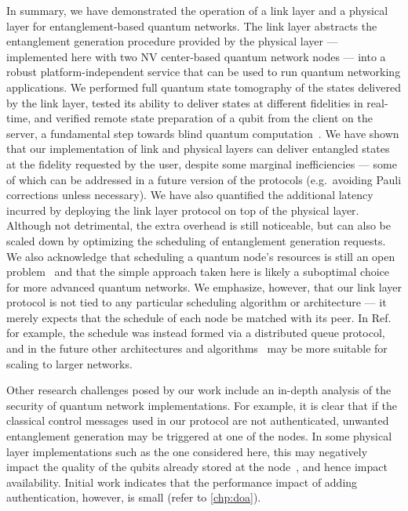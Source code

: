 In summary, we have demonstrated the operation of a link layer and a physical layer for
entanglement-based quantum networks. The link layer abstracts the entanglement generation procedure
provided by the physical layer --- implemented here with two NV center-based quantum network nodes
--- into a robust platform-independent service that can be used to run quantum networking
applications. We performed full quantum state tomography of the states delivered by the link layer,
tested its ability to deliver states at different fidelities in real-time, and verified remote state
preparation of a qubit from the client on the server, a fundamental step towards blind quantum
computation~\cite{broadbent_2009_ubqc}. We have shown that our implementation of link and physical
layers can deliver entangled states at the fidelity requested by the user, despite some marginal
inefficiencies --- some of which can be addressed in a future version of the protocols
(e.g.~avoiding Pauli corrections unless necessary). We have also quantified the additional latency
incurred by deploying the link layer protocol on top of the physical layer. Although not
detrimental, the extra overhead is still noticeable, but can also be scaled down by optimizing the
scheduling of entanglement generation requests. We also acknowledge that scheduling a quantum node's
resources is still an open problem~\cite{skrzypczyk_2021_arch, vardoyan_2019_performance,
vardoyan_2021_capacity} and that the simple approach taken here is likely a suboptimal choice for
more advanced quantum networks. We emphasize, however, that our link layer protocol is not tied to
any particular scheduling algorithm or architecture --- it merely expects that the schedule of each
node be matched with its peer. In Ref.~\cite{dahlberg_2019_egp} for example, the schedule was
instead formed via a distributed queue protocol, and in the future other architectures and
algorithms~\cite{skrzypczyk_2021_arch} may be more suitable for scaling to larger networks.

Other research challenges posed by our work include an in-depth analysis of the security of quantum
network implementations. For example, it is clear that if the classical control messages used in our
protocol are not authenticated, unwanted entanglement generation may be triggered at one of the
nodes. In some physical layer implementations such as the one considered here, this may negatively
impact the quality of the qubits already stored at the node~\cite{kalb_2018_dephasing}, and hence
impact availability. Initial work indicates that the performance impact of adding authentication,
however, is small (refer to \cref{chp:doa}).

